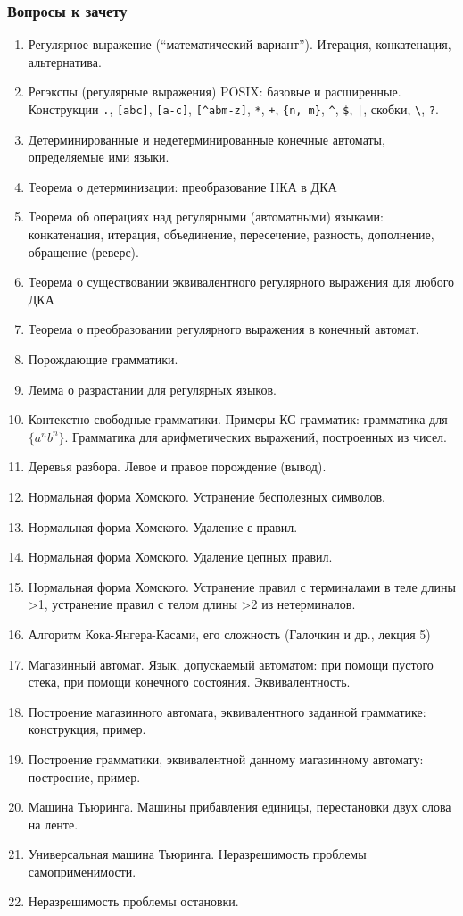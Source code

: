 \documentclass[a4paper,12pt]{article}
\begin{document}
\subsubsection*{Вопросы к зачету}
\begin{enumerate}
\item
Регулярное выражение (“математический вариант”). Итерация, конкатенация, альтернатива.
\item
Регэкспы (регулярные выражения) POSIX: базовые и расширенные. Конструкции \verb!.!, \verb![abc]!,
\verb![a-c]!, \verb![^abm-z]!, \verb!*!, \verb!+!, \verb!{n, m}!, \verb!^!, \verb!$!, \verb!|!,
скобки, \texttt{\textbackslash}, \verb!?!.
\item
Детерминированные и недетерминированные конечные автоматы, определяемые ими языки.
\item
Теорема о детерминизации: преобразование НКА в ДКА
\item
Теорема об операциях над регулярными (автоматными) языками: конкатенация, итерация, объединение, пересечение, разность, дополнение, обращение (реверс).
\item
Теорема о существовании эквивалентного регулярного выражения для любого ДКА
\item
Теорема о преобразовании регулярного выражения в конечный автомат.
\item
Порождающие грамматики.
\item
Лемма о разрастании для регулярных языков.
\item
Контекстно-свободные грамматики. Примеры КС-грамматик: грамматика для $\{a^nb^n\}$. Грамматика для арифметических выражений, построенных из чисел.
\item
Деревья разбора. Левое и правое порождение (вывод).
\item
Нормальная форма Хомского. Устранение бесполезных символов.
\item
Нормальная форма Хомского. Удаление ε-правил.
\item
Нормальная форма Хомского. Удаление цепных правил.
\item
Нормальная форма Хомского. Устранение правил с терминалами в теле длины >1, устранение правил с телом длины >2 из нетерминалов.
\item
Алгоритм Кока-Янгера-Касами, его сложность (Галочкин и др., лекция 5)
\item
Магазинный автомат. Язык, допускаемый автоматом: при помощи пустого стека, при помощи конечного состояния. Эквивалентность.
\item
Построение магазинного автомата, эквивалентного заданной грамматике: конструкция, пример.
\item
Построение грамматики, эквивалентной данному магазинному автомату: построение, пример.
\item
Машина Тьюринга. Машины прибавления единицы, перестановки двух слова на ленте.
\item
Универсальная машина Тьюринга. Неразрешимость проблемы самоприменимости.
\item
Неразрешимость проблемы остановки.
\end{enumerate}
\end{document}
